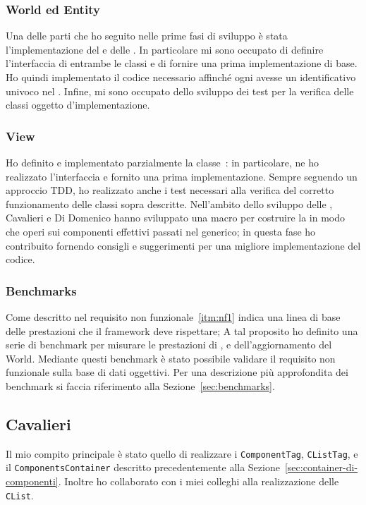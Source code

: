 \subsubsection{World ed Entity}
Una delle parti che ho seguito nelle prime fasi di sviluppo è stata l'implementazione del \World e delle \Entity.
In particolare mi sono occupato di definire l'interfaccia di entrambe le classi e di fornire una prima implementazione
di base.
Ho quindi implementato il codice necessario affinché ogni \Entity avesse un identificativo univoco nel \World.
Infine, mi sono occupato dello sviluppo dei test per la verifica delle classi oggetto d'implementazione.

\subsubsection{View}
Ho definito e implementato parzialmente la classe~\View: in particolare, ne ho realizzato l'interfaccia e fornito una
prima implementazione.
Sempre seguendo un approccio TDD, ho realizzato anche i test necessari alla verifica del corretto funzionamento delle
classi sopra descritte.
Nell'ambito dello sviluppo delle \View, Cavalieri e Di Domenico hanno sviluppato una macro per costruire la
\View in modo che operi sui componenti effettivi passati nel generico;
in questa fase ho contribuito fornendo consigli e suggerimenti per una migliore implementazione del codice.

\subsubsection{Benchmarks}
Come descritto nel requisito non funzionale~\ref{itm:nf1} indica una linea di base delle prestazioni che il framework
deve rispettare;
A tal proposito ho definito una serie di benchmark per misurare le prestazioni di \View, \System e dell'aggiornamento
del World.
Mediante questi benchmark è stato possibile validare il requisito non funzionale sulla base di dati oggettivi.
Per una descrizione più approfondita dei benchmark si faccia riferimento alla Sezione~\ref{sec:benchmarks}.

\subsection{Cavalieri}\label{subsec:giacomo-cavalieri}
Il mio compito principale è stato quello di realizzare i \texttt{ComponentTag}, \texttt{CListTag},
e il \texttt{ComponentsContainer} descritto precedentemente alla Sezione~\ref{sec:container-di-componenti}.
Inoltre ho collaborato con i miei colleghi alla realizzazione delle \texttt{CList}.

